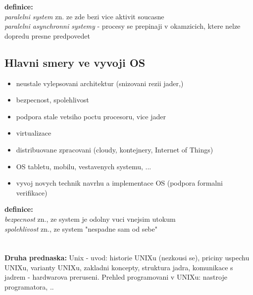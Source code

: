 \documentclass[a4paper, 11pt]{article}
\begin{document}
\noindent\textbf{definice:} \\[0.5em]
\textit{paralelni system} zn. ze zde bezi vice aktivit soucasne \\[0.2em]
\textit{paralelni asynchronni systemy} - procesy se prepinaji v okamzicich, ktere nelze dopredu presne predpovedet \\[1em]

\newpage

\subsection{Hlavni smery ve vyvoji OS}
\begin{itemize}
    \item neustale vylepsovani architektur (snizovani rezii jader,)
    \item bezpecnost, spolehlivost
    \item podpora stale vetsiho poctu procesoru, vice jader
    \item virtualizace
    \item distribuovane zpracovani (cloudy, kontejnery, Internet of Things)
    \item OS tabletu, mobilu, vestavenych systemu, ...
    \item vyvoj novych technik navrhu a implementace OS (podpora formalni verifikace) \\
\end{itemize}

\noindent\textbf{definice:} \\[0.5em]
\textit{bezpecnost} zn., ze system je odolny vuci vnejsim utokum \\[0.2em]
\textit{spolehlivost} zn., ze system "nespadne sam od sebe"




\newpage

\section{}
\textbf{Druha prednaska:} Unix - uvod: historie UNIXu (nezkousi se), priciny uspechu UNIXu, varianty UNIXu, zakladni koncepty, struktura jadra, komunikace s jadrem - hardwarova preruseni. Prehled programovani v UNIXu: nastroje programatora, ..
\end{document}
